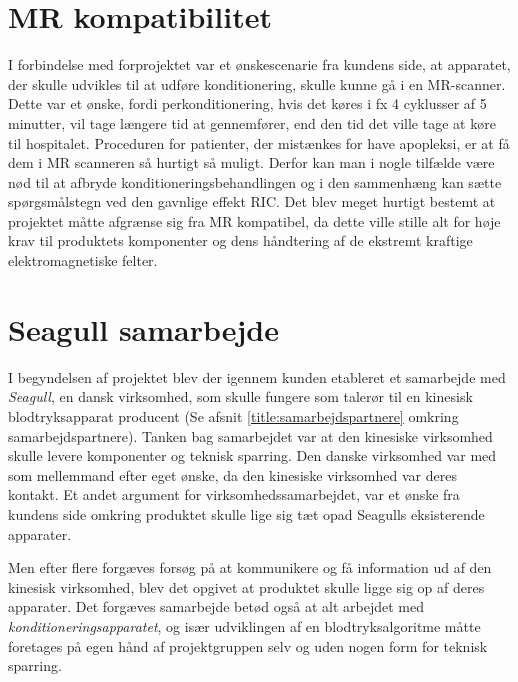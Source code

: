 \section{MR kompatibilitet}
I forbindelse med forprojektet var et ønskescenarie fra kundens side, at apparatet, der skulle udvikles til at udføre konditionering, skulle kunne gå i en MR-scanner. Dette var et ønske, fordi perkonditionering, hvis det køres i fx 4 cyklusser af 5 minutter, vil tage længere tid at gennemfører, end den tid det ville tage at køre til hospitalet. Proceduren for patienter, der mistænkes for have apopleksi, er at få dem i MR scanneren så hurtigt så muligt. Derfor kan man i nogle tilfælde være nød til at afbryde konditioneringsbehandlingen og i den sammenhæng kan sætte spørgsmålstegn ved den gavnlige effekt RIC. Det blev meget hurtigt bestemt at projektet måtte afgrænse sig fra MR kompatibel, da dette ville stille alt for høje krav til produktets komponenter og dens håndtering af de ekstremt kraftige elektromagnetiske felter.

\section{Seagull samarbejde}
I begyndelsen af projektet blev der igennem kunden etableret et samarbejde med \textit{Seagull}, en dansk virksomhed, som skulle fungere som talerør til en kinesisk blodtryksapparat producent (Se afsnit \ref{title:samarbejdspartnere} omkring samarbejdspartnere). Tanken bag samarbejdet var at den kinesiske virksomhed skulle levere komponenter og teknisk sparring. Den danske virksomhed var med som mellemmand efter eget ønske, da den kinesiske virksomhed var deres kontakt. Et andet argument for virksomhedssamarbejdet, var et ønske fra kundens side omkring produktet skulle lige sig tæt opad Seagulls eksisterende apparater. 

Men efter flere forgæves forsøg på at kommunikere og få information ud af den kinesisk virksomhed, blev det opgivet at produktet skulle ligge sig op af deres apparater. Det forgæves samarbejde betød også at alt arbejdet med \textit{konditioneringsapparatet}, og især udviklingen af en blodtryksalgoritme måtte foretages på egen hånd af projektgruppen selv og uden nogen form for teknisk sparring. 

